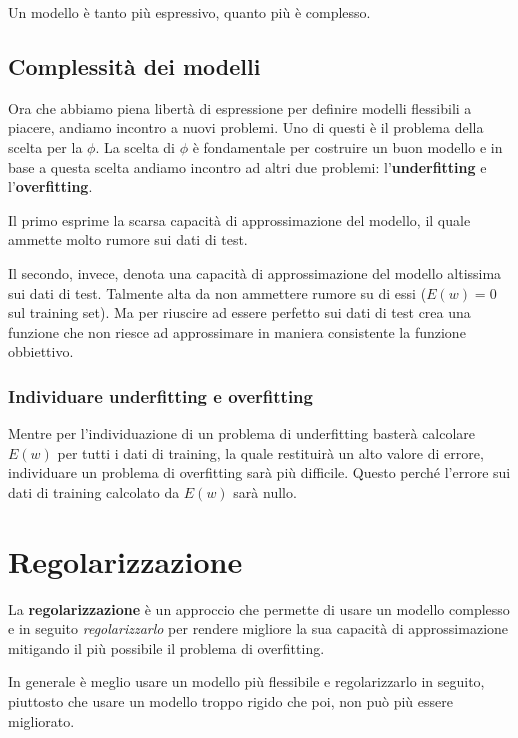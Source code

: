 Un modello \`e tanto pi\`u espressivo, quanto pi\`u \`e complesso.

\subsection{Complessit\`a dei modelli}
Ora che abbiamo piena libert\`a di espressione per definire modelli flessibili a piacere, andiamo incontro a nuovi
problemi. Uno di questi \`e il problema della scelta per la $\phi$. La scelta di $\phi$ \`e fondamentale per costruire
un buon modello e in base a questa scelta andiamo incontro ad altri due problemi: l'\textbf{underfitting} e
l'\textbf{overfitting}.

Il primo esprime la scarsa capacit\`a di approssimazione del modello, il quale ammette molto rumore sui dati di test.

Il secondo, invece, denota una capacit\`a di approssimazione del modello altissima sui dati di test. Talmente alta da
non ammettere rumore su di essi ($E(w) = 0$ sul training set). Ma per riuscire ad essere perfetto sui dati di test crea
una funzione che non riesce ad approssimare in maniera consistente la funzione obbiettivo.

\subsubsection{Individuare underfitting e overfitting}
Mentre per l'individuazione di un problema di underfitting baster\`a calcolare $E(w)$ per tutti i dati di training,
la quale restituir\`a un alto valore di errore, individuare un problema di overfitting sar\`a pi\`u difficile.
Questo perch\'e l'errore sui dati di training calcolato da $E(w)$ sar\`a nullo.

\section{Regolarizzazione}
La \textbf{regolarizzazione} \`e un approccio che permette di usare un modello complesso e in seguito
\emph{regolarizzarlo} per rendere migliore la sua capacit\`a di approssimazione mitigando il pi\`u possibile il
problema di overfitting.

In generale \`e meglio usare un modello pi\`u flessibile e regolarizzarlo in seguito, piuttosto che usare un modello
troppo rigido che poi, non pu\`o pi\`u essere migliorato.

